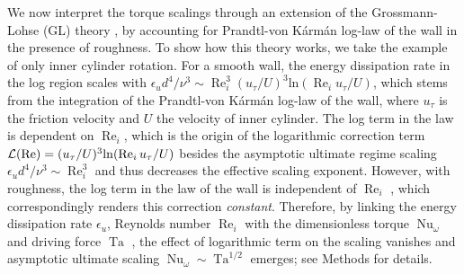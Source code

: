 \documentclass[aps,prl,superscriptaddress,preprint]{revtex4}
\renewcommand{\Re}{\operatorname{Re}}
\newcommand{\Ta}{\operatorname{Ta}}
\newcommand{\Nu}{\operatorname{Nu}_{\omega}}
\begin{document}
We now interpret the torque scalings through an extension of the Grossmann-Lohse (GL) theory \cite{gro11}, by accounting for Prandtl-von K\'arm\'an log-law of the wall \cite{sch00} in the presence of roughness. To show how this theory works, we take the example of only inner cylinder rotation. For a smooth wall, the energy dissipation rate in the log region scales with $\epsilon_{u} d^4/\nu^3 \sim \Re_i^3(u_\tau/U)^3 \mathrm{ln} (\Re_i u_\tau/U)$, which stems from the integration of the Prandtl-von K\'arm\'an log-law of the wall, where $u_\tau$ is the friction velocity and $U$ the velocity of inner cylinder. The log term in the law is dependent on $\Re_i$, which is the origin of the logarithmic correction term ${\cal{L}}(\Re)=(u_\tau/U)^3 \mathrm{ln} (\Re_i u_\tau/U)$ besides the asymptotic ultimate regime scaling $\epsilon_ud^4/\nu^3 \sim \Re_i^3$ and thus decreases the effective scaling exponent. However, with roughness, the log term in the law of the wall is independent of $\Re_i$  \cite{zhu17}, which correspondingly renders this correction \textit{constant}. Therefore, by linking the energy dissipation rate $\epsilon_{u}$, Reynolds number $\Re_i$ with the dimensionless torque $\Nu$ and driving force $\Ta$ \cite{eck07b}, the effect of logarithmic term on the scaling vanishes and asymptotic ultimate scaling $\Nu \sim \Ta^{1/2}$ emerges; see Methods for details.






\end{document}
